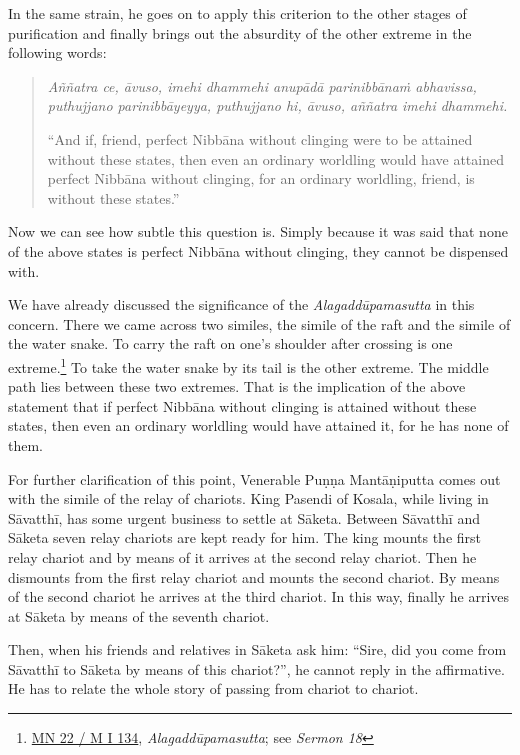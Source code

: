 In the same strain, he goes on to apply this criterion to the other stages of purification and finally brings out the absurdity of the other extreme in the following words:

\begin{quote}
\emph{Aññatra ce, āvuso, imehi dhammehi anupādā parinibbānaṁ abhavissa, puthujjano parinibbāyeyya, puthujjano hi, āvuso, aññatra imehi dhammehi.}

``And if, friend, perfect Nibbāna without clinging were to be attained without these states, then even an ordinary worldling would have attained perfect Nibbāna without clinging, for an ordinary worldling, friend, is without these states.''
\end{quote}

Now we can see how subtle this question is. Simply because it was said that none of the above states is perfect Nibbāna without clinging, they cannot be dispensed with.

We have already discussed the significance of the \emph{Alagaddūpamasutta} in this concern. There we came across two similes, the simile of the raft and the simile of the water snake. To carry the raft on one's shoulder after crossing is one extreme.\footnote{\href{https://suttacentral.net/mn22/pli/ms}{MN 22 / M I 134}, \emph{Alagaddūpamasutta}; see \emph{Sermon 18}} To take the water snake by its tail is the other extreme. The middle path lies between these two extremes. That is the implication of the above statement that if perfect Nibbāna without clinging is attained without these states, then even an ordinary worldling would have attained it, for he has none of them.

For further clarification of this point, Venerable Puṇṇa Mantāṇiputta comes out with the simile of the relay of chariots. King Pasendi of Kosala, while living in Sāvatthī, has some urgent business to settle at Sāketa. Between Sāvatthī and Sāketa seven relay chariots are kept ready for him. The king mounts the first relay chariot and by means of it arrives at the second relay chariot. Then he dismounts from the first relay chariot and mounts the second chariot. By means of the second chariot he arrives at the third chariot. In this way, finally he arrives at Sāketa by means of the seventh chariot.

Then, when his friends and relatives in Sāketa ask him: ``Sire, did you come from Sāvatthī to Sāketa by means of this chariot?'', he cannot reply in the affirmative. He has to relate the whole story of passing from chariot to chariot.

